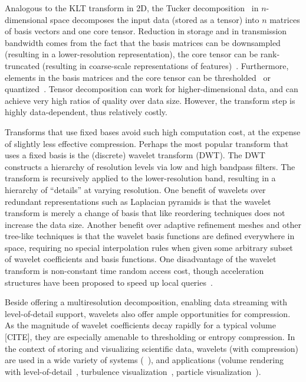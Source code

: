 Analogous to the KLT transform in 2D, the Tucker decomposition~\cite{tensor_dvr2015} in
$n$-dimensional space decomposes the input data (stored as a tensor) into $n$ matrices of basis
vectors and one core tensor. Reduction in storage and in transmission bandwidth comes from the fact
that the basis matrices can be downsampled (resulting in a lower-resolution representation), the
core tensor can be rank-truncated (resulting in coarse-scale representations of
features)~\cite{tamresh,tucker-thresholding,multiscale-tensor}. Furthermore, elements in the basis
matrices and the core tensor can be thresholded~\cite{tucker-thresholding} or
quantized~\cite{tamresh,multiscale-tensor}. Tensor decomposition can work for higher-dimensional
data, and can achieve very high ratios of quality over data size. However, the transform step is
highly data-dependent, thus relatively costly.

Transforms that use fixed bases avoid such high computation cost, at the expense of slightly less
effective compression. Perhaps the most popular transform that uses a fixed basis is the (discrete)
wavelet transform (DWT). The DWT constructs a hierarchy of resolution levels via low and high
bandpass filters. The transform is recursively applied to the lower-resolution band, resulting in a
hierarchy of ``details'' at varying resolution. One benefit of wavelets over redundant
representations such as Laplacian pyramids is that the wavelet transform is merely a change of basis
that like reordering techniques does not increase the data size. Another benefit over adaptive
refinement meshes and other tree-like techniques is that the wavelet basis functions are defined
everywhere in space, requiring no special interpolation rules when given some arbitrary subset of
wavelet coefficients and basis functions. One disadvantage of the wavelet transform is non-constant
time random access cost, though acceleration structures have been proposed to speed up local
queries~\cite{weiss}.

Beside offering a multiresolution decomposition, enabling data streaming with level-of-detail
support, wavelets also offer ample opportunities for compression. As the magnitude of wavelet
coefficients decay rapidly for a typical volume [CITE], they are especially amenable to thresholding
or entropy compression. In the context of storing and visualizing scientific data, wavelets (with
compression) are used in a wide variety of systems
(~\cite{multires_toolkit2003,vapor2007,woodring2011}), and applications (volume rendering with
level-of-detail~\cite{wavelet-compression-interactive-vis,multires-framework,rapid-compression-volume,interactive-rendering-large-volume,multires-volume-rendering},
turbulence visualization~\cite{treib}, particle visualization~\cite{sph-octree}).

